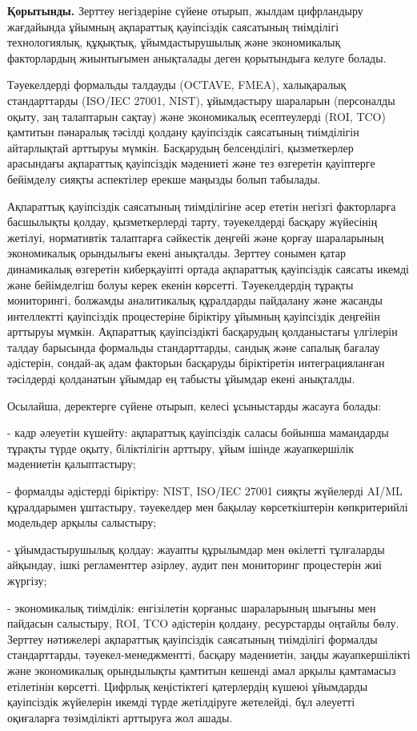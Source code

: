 \begin{multicols}{2}
{\bfseries Қорытынды.} Зерттеу негіздеріне сүйене отырып, жылдам
цифрландыру жағдайында ұйымның ақпараттық қауіпсіздік саясатының
тиімділігі технологиялық, құқықтық, ұйымдастырушылық және экономикалық
факторлардың жиынтығымен анықталады деген қорытындыға келуге болады.

Тәуекелдерді формальды талдауды (OCTAVE, FMEA), халықаралық
стандарттарды (ISO/IEC 27001, NIST), ұйымдастыру шараларын (персоналды
оқыту, заң талаптарын сақтау) және экономикалық есептеулерді (ROI, TCO)
қамтитын пәнаралық тәсілді қолдану қауіпсіздік саясатының тиімділігін
айтарлықтай арттыруы мүмкін. Басқарудың белсенділігі, қызметкерлер
арасындағы ақпараттық қауіпсіздік мәдениеті және тез өзгеретін
қауіптерге бейімделу сияқты аспектілер ерекше маңызды болып табылады.

Ақпараттық қауіпсіздік саясатының тиімділігіне әсер ететін негізгі
факторларға басшылықты қолдау, қызметкерлерді тарту, тәуекелдерді
басқару жүйесінің жетілуі, нормативтік талаптарға сәйкестік деңгейі және
қорғау шараларының экономикалық орындылығы екені анықталды. Зерттеу
сонымен қатар динамикалық өзгеретін киберқауіпті ортада ақпараттық
қауіпсіздік саясаты икемді және бейімделгіш болуы керек екенін көрсетті.
Тәуекелдердің тұрақты мониторингі, болжамды аналитикалық құралдарды
пайдалану және жасанды интеллектті қауіпсіздік процестеріне біріктіру
ұйымның қауіпсіздік деңгейін арттыруы мүмкін. Ақпараттық қауіпсіздікті
басқарудың қолданыстағы үлгілерін талдау барысында формальды
стандарттарды, сандық және сапалық бағалау әдістерін, сондай-ақ адам
факторын басқаруды біріктіретін интеграцияланған тәсілдерді қолданатын
ұйымдар ең табысты ұйымдар екені анықталды.

Осылайша, деректерге сүйене отырып, келесі ұсыныстарды жасауға болады:

- кадр әлеуетін күшейту: ақпараттық қауіпсіздік саласы бойынша
мамандарды тұрақты түрде оқыту, біліктілігін арттыру, ұйым ішінде
жауапкершілік мәдениетін қалыптастыру;

- формалды әдістерді біріктіру: NIST, ISO/IEC 27001 сияқты жүйелерді
AI/ML құралдарымен ұштастыру, тәуекелдер мен бақылау көрсеткіштерін
көпкритерийлі модельдер арқылы салыстыру;

- ұйымдастырушылық қолдау: жауапты құрылымдар мен өкілетті тұлғаларды
айқындау, ішкі регламенттер әзірлеу, аудит пен мониторинг процестерін
жиі жүргізу;

- экономикалық тиімділік: енгізілетін қорғаныс шараларының шығыны мен
пайдасын салыстыру, ROI, TCO әдістерін қолдану, ресурстарды оңтайлы
бөлу.
Зерттеу нәтижелері ақпараттық қауіпсіздік саясатының тиімділігі формалды
стандарттарды, тәуекел-менеджментті, басқару мәдениетін, заңды
жауапкершілікті және экономикалық орындылықты қамтитын кешенді амал
арқылы қамтамасыз етілетінін көрсетті. Цифрлық кеңістіктегі қатерлердің
күшеюі ұйымдарды қауіпсіздік жүйелерін икемді түрде жетілдіруге
жетелейді, бұл әлеуетті оқиғаларға төзімділікті арттыруға жол ашады.
\end{multicols}

